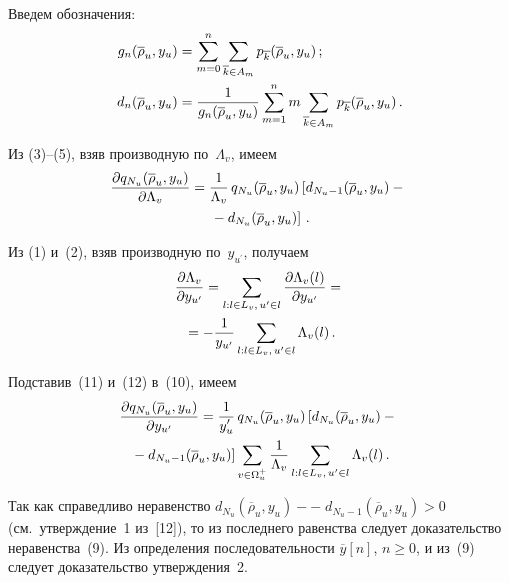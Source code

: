 \begin{multicols}{2}
     Введем обозначения:
     \begin{align*}
     g_n(\overline{\rho}_u,y_u) &=\sum\limits_{m=0}^n\sum\limits_{\overline{k}\in A_m} p_{\overline{k}}(\overline{\rho}_u,
     y_u)\,;\\
     d_n(\overline{\rho}_u,y_u) &= \displaystyle\frac{\displaystyle 1\mathstrut}{\displaystyle g_n(\overline{\rho}_u,y_u)\mathstrut}
     \sum\limits_{m=1}^n m \sum\limits_{\overline{k}\in A_m} p_{\overline{k}}(\overline{\rho}_u,y_u)\,.
     \end{align*}
       
     Из (3)--(5), взяв производную по~$\Lambda_v$, имеем
     \begin{multline}
     \displaystyle\frac{\displaystyle \partial q_{N_u}(\overline{\rho}_u,y_u)\mathstrut}{\displaystyle \partial\Lambda_v\mathstrut} = 
\displaystyle\frac{\displaystyle 1\mathstrut}{\displaystyle \Lambda_v\mathstrut}\,q_{N_u}(\overline{\rho}_u,y_u)\left [ d_{N_u-1}(\overline{\rho}_u,y_u)-{}\right.\\
\left.{}-
d_{N_u}(\overline{\rho}_u,y_u)\right ]\,.
     \end{multline}
     
     Из (1) и~(2), взяв производную по~$y_{u^\prime}$, получаем
     \begin{multline}
     \displaystyle\frac{\displaystyle \partial \Lambda_v\mathstrut}{\displaystyle \partial y_{u^\prime}\mathstrut} =
     \sum\limits_{l:l\in L_v,\, u^\prime\in l} \displaystyle\frac{\displaystyle \partial \Lambda_v(l)\mathstrut}{\displaystyle \partial y_{u^\prime}\mathstrut} ={}\\
     {}=
     -\displaystyle\frac{\displaystyle 1\mathstrut}{\displaystyle y_{u^\prime}\mathstrut}\sum\limits_{l:l\in L_v,\,u^\prime\in l} \Lambda_v(l)\,.
     \end{multline}

     
     Подставив~(11) и~(12) в~(10), имеем
     \begin{multline*}
     \displaystyle\frac{\displaystyle \partial q_{N_u}(\overline{\rho}_u,y_u)\mathstrut}{\displaystyle \partial y_{u^\prime}\mathstrut} = 
\displaystyle\frac{\displaystyle 1\mathstrut}{\displaystyle y_u^\prime\mathstrut}\,q_{N_u}(\overline{\rho}_u, y_u)\left [d_{N_u}(\overline{\rho}_u,y_u)-{}\right.\\
\left.{}-
d_{N_u -1} (\overline{\rho}_u,y_u)\right 
]\sum\limits_{v\in\Omega_u^+}\displaystyle\frac{\displaystyle 1\mathstrut}{\displaystyle \Lambda_v\mathstrut} \sum\limits_{l:l\in L_v,\, 
u^\prime\in l} \Lambda_v(l)\,.
     \end{multline*}
     
     Так как справедливо неравенство $d_{N_u}(\overline{\rho}_u,y_u)-$\linebreak $-\;d_{N_u 
-1} (\overline{\rho}_u,y_u) >0$ (см.\ утверждение~1 из~[12]), то из последнего 
равенства следует доказательство неравенства~(9). Из определения 
последовательности $\overline{y}[n]$, $n\geq 0$, и из~(9) следует 
доказательство утверждения~2.
     
     \medskip
     

\end{multicols}
